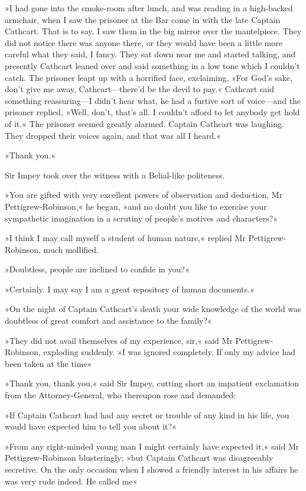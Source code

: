 »I had gone into the smoke-room after lunch, and was reading in a high-backed armchair, when I saw the prisoner at the Bar come in with the late Captain Cathcart. That is to say, I saw them in the big mirror over the mantelpiece. They did not notice there was anyone there, or they would have been a little more careful what they said, I fancy.  They sat down near me and started talking, and presently Cathcart leaned over and said something in a low tone which I couldn't catch.  The prisoner leapt up with a horrified face, exclaiming, »For God's sake, don't give me away, Cathcart\allowbreak---\allowbreak there'd be the devil to pay.« Cathcart said something reassuring\allowbreak---\allowbreak I didn't hear what, he had a furtive sort of voice\allowbreak---\allowbreak and the prisoner replied, »Well, don't, that's all. I couldn't afford to let anybody get hold of it.« The prisoner seemed greatly alarmed. Captain Cathcart was laughing. They dropped their voices again, and that was all I heard.«

»Thank you.«

Sir Impey took over the witness with a Belial-like politeness.

»You are gifted with very excellent powers of observation and deduction, Mr Pettigrew-Robinson,« he began, »and no doubt you like to exercise your sympathetic imagination in a scrutiny of people's motives and characters?«

»I think I may call myself a student of human nature,« replied Mr  Pettigrew-Robinson, much mollified.

»Doubtless, people are inclined to confide in you?«

»Certainly. I may say I am a great repository of human documents.«

»On the night of Captain Cathcart's death your wide knowledge of the world was doubtless of great comfort and assistance to the family?«

»They did not avail themselves of my experience, sir,« said Mr  Pettigrew-Robinson, exploding suddenly. »I was ignored completely. If only my advice had been taken at the time\longdash«

»Thank you, thank you,« said Sir Impey, cutting short an impatient exclamation from the Attorney-General, who thereupon rose and demanded:

»If Captain Cathcart had had any secret or trouble of any kind in his life, you would have expected him to tell you about it?«

»From any right-minded young man I might certainly have expected it,« said Mr Pettigrew-Robinson blusteringly; »but Captain Cathcart was disagreeably secretive. On the only occasion when I showed a friendly interest in his affairs he was very rude indeed. He called me\longdash«

